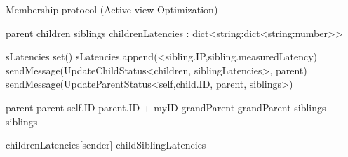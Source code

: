\begin{algorithm}
    \begin{algorithmic}[1]

        \caption{Membership protocol (Active view Optimization)}

        \asdstate
            \State parent 
            \State children  
            \State siblings  
            \State childrenLatencies : dict<string:dict<string:number>>
        \asdend

                \State sLatencies \asdassign set()
                    \State sLatencies.append(<sibling.IP,sibling.measuredLatency)
                \EndFor
                \State sendMessage(UpdateChildStatus<children, siblingLatencies>, parent)
            \EndIf
                \State sendMessage(UpdateParentStatus<self,child.ID, parent, siblings>)
            \EndFor
        \asdend

                \State parent \asdassign parent
                \State self.ID \asdassign parent.ID + myID
                \State grandParent \asdassign grandParent
                \State siblings \asdassign siblings
            \EndIf
        \asdend

                \State childrenLatencies[sender] \asdassign childSiblingLatencies
            \EndIf
        \asdend


\end{algorithmic}
\end{algorithm}
